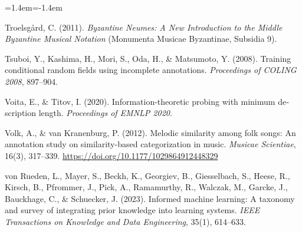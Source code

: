 \documentclass[11pt,a4paper]{article}
\newenvironment{reflist}{\begin{list}{}{\leftmargin=1.4em\itemindent=-1.4em\itemsep=0.8pt\parsep=0pt}\small}{\end{list}}
\begin{document}
\begin{otherlanguage}{english}
\begin{reflist}
\item Troelsgård, C. (2011). \emph{Byzantine Neumes: A New Introduction to the Middle Byzantine Musical Notation} (Monumenta Musicae Byzantinae, Subsidia 9).
\item Tsuboi, Y., Kashima, H., Mori, S., Oda, H., \& Matsumoto, Y. (2008). Training conditional random fields using incomplete annotations. \emph{Proceedings of COLING 2008}, 897--904.
\item Voita, E., \& Titov, I. (2020). Information-theoretic probing with minimum description length. \emph{Proceedings of EMNLP 2020}.
\item Volk, A., \& van Kranenburg, P. (2012). Melodic similarity among folk songs: An annotation study on similarity-based categorization in music. \emph{Musicae Scientiae}, 16(3), 317--339. \url{https://doi.org/10.1177/1029864912448329}
\item von Rueden, L., Mayer, S., Beckh, K., Georgiev, B., Giesselbach, S., Heese, R., Kirsch, B., Pfrommer, J., Pick, A., Ramamurthy, R., Walczak, M., Garcke, J., Bauckhage, C., \& Schuecker, J. (2023). Informed machine learning: A taxonomy and survey of integrating prior knowledge into learning systems. \emph{IEEE Transactions on Knowledge and Data Engineering}, 35(1), 614--633.
\end{reflist}
\end{otherlanguage}
\end{document}
